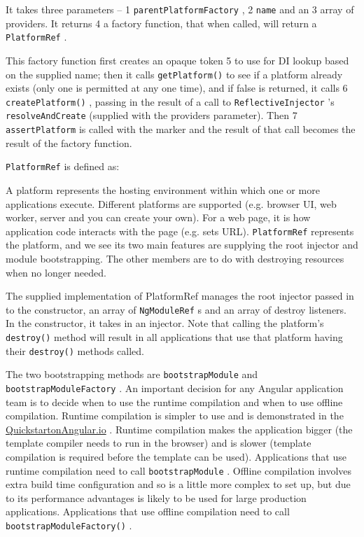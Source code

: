 

It takes three parameters –
1
\texttt{parentPlatformFactory}
,
2
\texttt{name}
and an
3
array of
providers. It returns
4
a factory function, that when called, will return a
\texttt{PlatformRef}
.

This factory function first creates an opaque token
5
to use for DI lookup based on the
supplied name; then it calls
\texttt{getPlatform()}
to see if a platform already exists (only
one is permitted at any one time), and if false is returned, it calls
6
\texttt{createPlatform()}
, passing in the result of a call to
\texttt{ReflectiveInjector}
’s
\texttt{resolveAndCreate}
(supplied with the providers parameter). Then
7
\texttt{assertPlatform}
is called with the marker and the result of that call becomes the result of the factory
function.

\texttt{PlatformRef}
is defined as:



A platform represents the hosting environment within which one or more applications
execute. Different platforms are supported (e.g. browser UI, web worker, server and
you can create your own). For a web page, it is how application code interacts with
the page (e.g. sets URL).
\texttt{PlatformRef}
represents the platform, and we see its two
main features are supplying the root injector and module bootstrapping. The other
members are to do with destroying resources when no longer needed.

The supplied implementation of PlatformRef manages the root injector passed in to
the constructor, an array of
\texttt{NgModuleRef}
s and an array of destroy listeners. In the
constructor,  it takes in an injector. Note that calling the platform’s
\texttt{destroy()}
method
will result in all applications that use that platform having their
\texttt{destroy()}
methods
called.

The two bootstrapping methods are
\texttt{bootstrapModule}
and
\texttt{bootstrapModuleFactory}
.
An important decision for any Angular application team is to decide when to use the
runtime compilation and when to use offline compilation. Runtime compilation is
simpler to use and is demonstrated in the
\url{QuickstartonAngular.io}
. Runtime
compilation makes the application bigger (the template compiler needs to run in the
browser) and is slower (template compilation is required before the template can be
used). Applications that use runtime compilation need to call
\texttt{bootstrapModule}
.
Offline compilation involves extra build time configuration and so is a little more
complex to set up, but due to its performance advantages is likely to be used for large
production applications. Applications that use offline compilation need to call
\texttt{bootstrapModuleFactory()}
.

